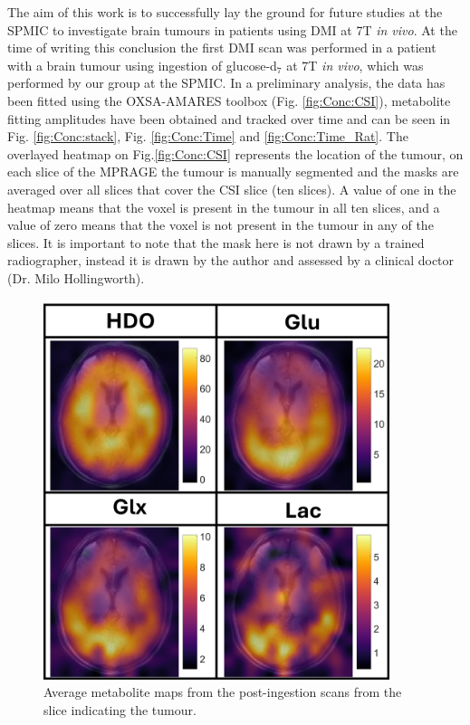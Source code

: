 The aim of this work is to successfully lay the ground for future studies at the SPMIC to investigate brain tumours in patients using \ac{DMI} at 7T \textit{in vivo}. At the time of writing this conclusion the first DMI scan was performed in a patient with a brain tumour using ingestion of glucose-d$_7$ at 7T \textit{in vivo}, which was performed by our group at the SPMIC. In a preliminary analysis, the data has been fitted using the OXSA-AMARES toolbox \cite{Purvis2017OXSA:MATLAB} (Fig. \ref{fig:Conc:CSI}), metabolite fitting amplitudes have been obtained and tracked over time and can be seen in Fig. \ref{fig:Conc:stack}, Fig. \ref{fig:Conc:Time} and \ref{fig:Conc:Time_Rat}. The overlayed heatmap on Fig.\ref{fig:Conc:CSI} represents the location of the tumour, on each slice of the MPRAGE the tumour is manually segmented and the masks are averaged over all slices that cover the \ac{CSI} slice (ten slices). A value of one in the heatmap means that the voxel is present in the tumour in all ten slices, and a value of zero means that the voxel is not present in the tumour in any of the slices. It is important to note that the mask here is not drawn by a trained radiographer, instead it is drawn by the author and assessed by a clinical doctor (Dr. Milo Hollingworth).

\begin{figure}[H]
    \centering
    \includegraphics[width = 0.9\textwidth]{Figures/Conclusion/Maps.png}
    \caption{Average metabolite maps from the post-ingestion scans from the slice indicating the tumour.}
    \label{fig:Conc:Maps}
\end{figure}

